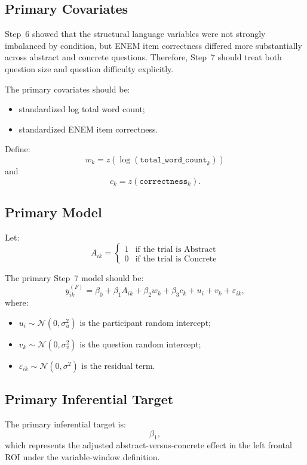 \subsection{Primary Covariates}
Step~6 showed that the structural language variables were not strongly imbalanced by condition,
but ENEM item correctness differed more substantially across abstract and concrete questions.
Therefore, Step~7 should treat both question size and question difficulty explicitly.

The primary covariates should be:
\begin{itemize}
    \item standardized log total word count;
    \item standardized ENEM item correctness.
\end{itemize}

Define:
\begin{equation}
w_k = z\!\left(\log(\texttt{total\_word\_count}_k)\right)
\end{equation}
and
\begin{equation}
c_k = z(\texttt{correctness}_k).
\end{equation}

\subsection{Primary Model}
Let:
\begin{equation}
A_{ik} =
\begin{cases}
1 & \text{if the trial is Abstract} \\
0 & \text{if the trial is Concrete}
\end{cases}
\end{equation}

The primary Step~7 model should be:
\begin{equation}
y^{(F)}_{ik}
=
\beta_0
+
\beta_1 A_{ik}
+
\beta_2 w_k
+
\beta_3 c_k
+
u_i
+
v_k
+
\varepsilon_{ik},
\end{equation}
where:
\begin{itemize}
    \item \(u_i \sim \mathcal{N}(0,\sigma_u^2)\) is the participant random intercept;
    \item \(v_k \sim \mathcal{N}(0,\sigma_v^2)\) is the question random intercept;
    \item \(\varepsilon_{ik} \sim \mathcal{N}(0,\sigma^2)\) is the residual term.
\end{itemize}

\subsection{Primary Inferential Target}
The primary inferential target is:
\begin{equation}
\beta_1,
\end{equation}
which represents the adjusted abstract-versus-concrete effect in the left frontal ROI under the
variable-window definition.

